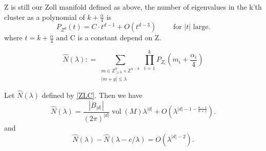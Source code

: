 \documentclass[10pt,a4paper]{amsart}
\newcommand{\Z}{{\mathbb Z}}
\newcommand{\vol}{\operatorname{vol}}
\begin{document}
\begin{lemma}\label{zec}
    Z is still our Zoll manifold defined as above, the number of eigenvalues in the k'th cluster as a polynomial of $k+\frac{\alpha}{4}$ is 
    \begin{equation} \label{zolclu}
    P_{Z^d}(t) = C \cdot t^{d-1} + O(t^{d-3}) \qquad \text{ for $|t|$ large.}
    \end{equation}
    where $t=k + \frac{\alpha}{4}$ and C is a constant depend on Z.
\end{lemma}

\begin{equation}\label{ZLC}
    \hat{N}(\lambda) : = \sum_{\substack{m \in \Z_{\geq 0}^k \times \Z^{n-k} \\ |m+y| \le \lambda }} \prod_{i = 1}^k P_{Z_i} (m_i +\frac{\alpha_i}{4})
\end{equation}

\begin{lemma}\label{ZollLatticeCount}
    Let $\hat{N}(\lambda)$ defined by \eqref{ZLC}. Then we have 
    \begin{equation}
        \hat{N}(\lambda) = \frac{|B_{|d|}|}{(2\pi)^{|d|}} \vol(M) \lambda^{|d|} + O(\lambda^{|d|-1-\frac{n-1}{n+1}}).
    \end{equation}
    and 
    \begin{equation}
        \hat{N}(\lambda) -\hat{N}(\lambda- c/\lambda) = O (\lambda^{|d|-2}).
    \end{equation}
\end{lemma}
\end{document}
